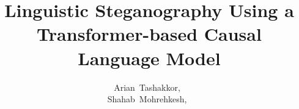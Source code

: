 \documentclass[journal,onecolumn]{IEEEtran}
\begin{document}
%
\title{Linguistic Steganography Using a Transformer-based Causal Language Model}
%
%
%

\author{Arian~Tashakkor,~\\Shahab~Mohrehkesh,~}

% 
%



% 
\end{document}
